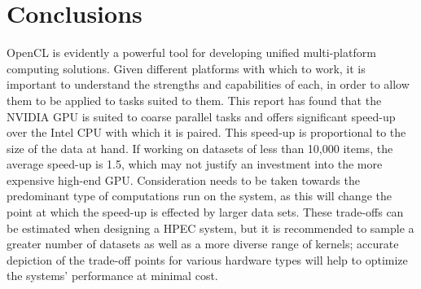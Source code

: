 \section{Conclusions}
OpenCL is evidently a powerful tool for developing unified multi-platform computing solutions. Given different platforms with which to work, it is important to understand the strengths and capabilities of each, in order to allow them to be applied to tasks suited to them. This report has found that the NVIDIA GPU is suited to coarse parallel tasks and offers significant speed-up over the Intel CPU with which it is paired. This speed-up is proportional to the size of the data at hand. If working on datasets of less than 10,000 items, the average speed-up is 1.5, which may not justify an investment into the more expensive high-end GPU.  
\newline Consideration needs to be taken towards the predominant type of computations run on the system, as this will change the point at which the speed-up is effected by larger data sets.  These trade-offs can be estimated when designing a HPEC system, but it is recommended to sample a greater number of datasets as well as a more diverse range of kernels; accurate depiction of the trade-off points for various hardware types will help to optimize the systems' performance at minimal cost.